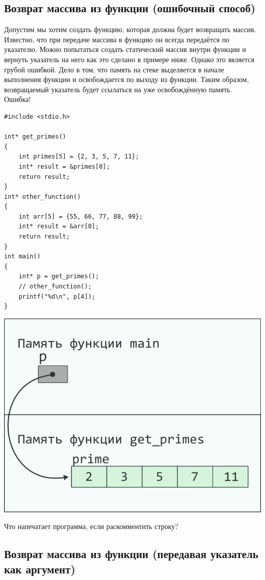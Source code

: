 \documentclass{article}
\begin{document}
\newpage

\subsection*{Возврат массива из функции (ошибочный способ)}
Допустим мы хотим создать функцию, которая должна будет возвращать массив.
Известно, что при передаче массива в функцию он всегда передаётся по указателю.
Можно попытаться создать статический массив внутри функции и вернуть указатель на него как
это сделано в примере ниже.
Однако это является грубой ошибкой. Дело в том, что память на стеке
выделяется в начале выполнения функции и освобождается по выходу из функции.
Таким образом, возвращаемый указатель будет ссылаться на уже освобождённую память. Ошибка!
\begin{multicols}{2}
\begin{lstlisting}
#include <stdio.h>

int* get_primes()
{
	int primes[5] = {2, 3, 5, 7, 11};
	int* result = &primes[0];
	return result;
}
int* other_function()
{
	int arr[5] = {55, 66, 77, 88, 99};
	int* result = &arr[0];
	return result;
}
int main()
{
	int* p = get_primes();
	// other_function();
	printf("%d\n", p[4]);
}
\end{lstlisting}
\columnbreak
\begin{center}
\includegraphics[scale=1]{../../images/pointer_schemes/function_return_stack_array.png}
\end{center}
\end{multicols}
Что напечатает программа, если раскомментить строку?

\subsection*{Возврат массива из функции (передавая указатель как аргумент)}
\end{document}
